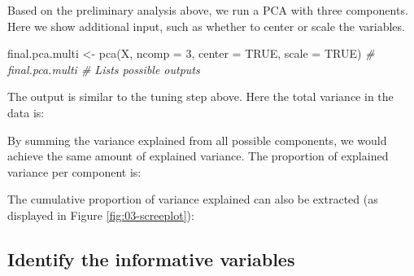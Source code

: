 \documentclass[
]{book}
\newenvironment{Shaded}{\begin{snugshade}}{\end{snugshade}}
\newcommand{\AttributeTok}[1]{\textcolor[rgb]{0.77,0.63,0.00}{#1}}
\newcommand{\CommentTok}[1]{\textcolor[rgb]{0.56,0.35,0.01}{\textit{#1}}}
\newcommand{\ConstantTok}[1]{\textcolor[rgb]{0.00,0.00,0.00}{#1}}
\newcommand{\DecValTok}[1]{\textcolor[rgb]{0.00,0.00,0.81}{#1}}
\newcommand{\FunctionTok}[1]{\textcolor[rgb]{0.00,0.00,0.00}{#1}}
\newcommand{\NormalTok}[1]{#1}
\newcommand{\OtherTok}[1]{\textcolor[rgb]{0.56,0.35,0.01}{#1}}
\newcommand{\SpecialCharTok}[1]{\textcolor[rgb]{0.00,0.00,0.00}{#1}}
\begin{document}
Based on the preliminary analysis above, we run a PCA with three components. Here we show additional input, such as whether to center or scale the variables.

\begin{Shaded}
\begin{Highlighting}[]
\NormalTok{final.pca.multi }\OtherTok{\textless{}{-}} \FunctionTok{pca}\NormalTok{(X, }\AttributeTok{ncomp =} \DecValTok{3}\NormalTok{, }\AttributeTok{center =} \ConstantTok{TRUE}\NormalTok{, }\AttributeTok{scale =} \ConstantTok{TRUE}\NormalTok{)}
\CommentTok{\# final.pca.multi  \# Lists possible outputs}
\end{Highlighting}
\end{Shaded}

The output is similar to the tuning step above. Here the total variance in the data is:

\begin{Shaded}
\end{Shaded}

By summing the variance explained from all possible components, we would achieve the same amount of explained variance. The proportion of explained variance per component is:

\begin{Shaded}
\end{Shaded}

The cumulative proportion of variance explained can also be extracted (as displayed in Figure \ref{fig:03-screeplot}):

\begin{Shaded}
\end{Shaded}

\hypertarget{03:pca-vars}{%
\subsection{Identify the informative variables}\label{03:pca-vars}}
\end{document}
